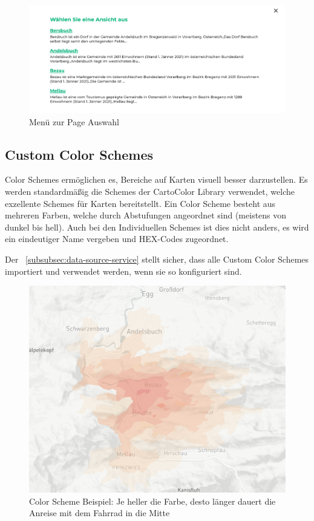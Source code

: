 \begin{figure}[hbt!]
    \centering
    \includegraphics[scale=.9]{pics/menu}
    \caption{Menü zur Page Auswahl}
    \label{fig:menu}
\end{figure}

\subsection{Custom Color Schemes}
Color Schemes ermöglichen es, Bereiche auf Karten visuell besser darzustellen.
Es werden standardmäßig die Schemes der CartoColor Library verwendet, welche exzellente Schemes für Karten bereitstellt.
Ein Color Scheme besteht aus mehreren Farben, welche durch Abstufungen angeordnet sind (meistens von dunkel bis hell).
Auch bei den Individuellen Schemes ist dies nicht anders, es wird ein eindeutiger Name vergeben und HEX-Codes zugeordnet.

Der ~\ref{subsubsec:data-source-service} stellt sicher, dass alle Custom Color Schemes importiert und verwendet werden, wenn sie so konfiguriert sind.

\begin{figure}[hbt!]
    \centering
    \includegraphics[scale=.6]{pics/color-scheme-example}
    \caption{Color Scheme Beispiel: Je heller die Farbe, desto länger dauert die Anreise mit dem Fahrrad in die Mitte}
    \label{fig:color-scheme-example}
\end{figure}


